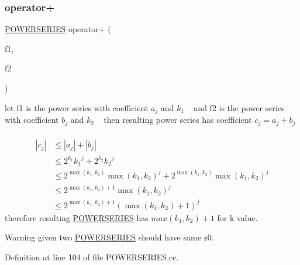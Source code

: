 \subsubsection{\texorpdfstring{operator+}{operator+}}
{\footnotesize\ttfamily \mbox{\hyperlink{classi_r_r_a_m_1_1_p_o_w_e_r_s_e_r_i_e_s}{P\+O\+W\+E\+R\+S\+E\+R\+I\+ES}} operator+ (\begin{DoxyParamCaption}\item[{const \mbox{\hyperlink{classi_r_r_a_m_1_1_p_o_w_e_r_s_e_r_i_e_s}{P\+O\+W\+E\+R\+S\+E\+R\+I\+ES}} \&}]{f1,  }\item[{const \mbox{\hyperlink{classi_r_r_a_m_1_1_p_o_w_e_r_s_e_r_i_e_s}{P\+O\+W\+E\+R\+S\+E\+R\+I\+ES}} \&}]{f2 }\end{DoxyParamCaption})\hspace{0.3cm}{\ttfamily [friend]}}

let f1 is the power series with coefficient $ a_j $ and $ k_1 $ ~\newline
and f2 is the power series with coefficient $ b_j $ and $ k_2 $ ~\newline
then resulting power series has coefficient $ c_j = a_j + b_j $ ~\newline
 \begin{align*} |c_j| &\leq |a_j| + |b_j|\\ &\leq 2^{k_1} {k_1}^j + 2^{k_2} {k_2}^j \\ &\leq 2^{\max(k_1,k_2)} {\max(k_1,k_2)}^j + 2^{\max(k_1,k_2)} {\max(k_1,k_2)}^j \\ &\leq 2^{\max(k_1,k_2) +1} {\max(k_1,k_2)}^j \\ &\leq 2^{\max(k_1,k_2)+1} (\max(k_1,k_2)+1)^j \end{align*} therefore resulting \mbox{\hyperlink{classi_r_r_a_m_1_1_p_o_w_e_r_s_e_r_i_e_s}{P\+O\+W\+E\+R\+S\+E\+R\+I\+ES}} has $ max(k_1, k_2)+1 $ for k value.~\newline
\begin{DoxyWarning}{Warning}
given two \mbox{\hyperlink{classi_r_r_a_m_1_1_p_o_w_e_r_s_e_r_i_e_s}{P\+O\+W\+E\+R\+S\+E\+R\+I\+ES}} should have same z0. 
\end{DoxyWarning}


Definition at line 104 of file P\+O\+W\+E\+R\+S\+E\+R\+I\+E\+S.\+cc.


\begin{DoxyCode}{0}

\end{DoxyCode}


